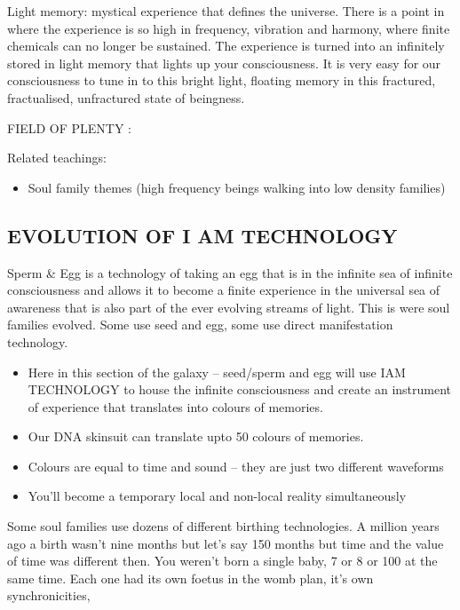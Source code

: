 Light memory: mystical experience that defines the universe. There is a
point in where the experience is so high in frequency, vibration and
harmony, where finite chemicals can no longer be sustained. The
experience is turned into an infinitely stored in light memory that
lights up your consciousness. It is very easy for our consciousness to
tune in to this bright light, floating memory in this fractured,
fractualised, unfractured state of beingness.

FIELD OF PLENTY :

Related teachings:

\begin{itemize}
\tightlist
\item
  Soul family themes (high frequency beings walking into low density
  families)
\end{itemize}

\subsection{EVOLUTION OF I AM
TECHNOLOGY}\label{evolution-of-i-am-technology}

Sperm \& Egg is a technology of taking an egg that is in the infinite
sea of infinite consciousness and allows it to become a finite
experience in the universal sea of awareness that is also part of the
ever evolving streams of light. This is were soul families evolved. Some
use seed and egg, some use direct manifestation technology.

\begin{itemize}
\item
  Here in this section of the galaxy -- seed/sperm and egg will use IAM
  TECHNOLOGY to house the infinite consciousness and create an
  instrument of experience that translates into colours of memories.
\item
  Our DNA skinsuit can translate upto 50 colours of memories.
\item
  Colours are equal to time and sound -- they are just two different
  waveforms
\item
  You'll become a temporary local and non-local reality simultaneously
\end{itemize}

Some soul families use dozens of different birthing technologies. A
million years ago a birth wasn't nine months but let's say 150 months
but time and the value of time was different then. You weren't born a
single baby, 7 or 8 or 100 at the same time. Each one had its own foetus
in the womb plan, it's own synchronicities,

